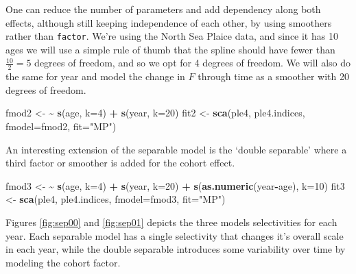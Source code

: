 \documentclass[
]{book}
\newenvironment{Shaded}{\begin{snugshade}}{\end{snugshade}}
\newcommand{\AttributeTok}[1]{\textcolor[rgb]{0.13,0.29,0.53}{#1}}
\newcommand{\DecValTok}[1]{\textcolor[rgb]{0.00,0.00,0.81}{#1}}
\newcommand{\ErrorTok}[1]{\textcolor[rgb]{0.64,0.00,0.00}{\textbf{#1}}}
\newcommand{\FunctionTok}[1]{\textcolor[rgb]{0.13,0.29,0.53}{\textbf{#1}}}
\newcommand{\NormalTok}[1]{#1}
\newcommand{\OtherTok}[1]{\textcolor[rgb]{0.56,0.35,0.01}{#1}}
\newcommand{\SpecialCharTok}[1]{\textcolor[rgb]{0.81,0.36,0.00}{\textbf{#1}}}
\newcommand{\StringTok}[1]{\textcolor[rgb]{0.31,0.60,0.02}{#1}}
\begin{document}
One can reduce the number of parameters and add dependency along both effects, although still keeping independence of each other, by using smoothers rather than \texttt{factor}. We're using the North Sea Plaice data, and since it has 10 ages we will use a simple rule of thumb that the spline should have fewer than \(\frac{10}{2} = 5\) degrees of freedom, and so we opt for 4 degrees of freedom. We will also do the same for year and model the change in \(F\) through time as a smoother with 20 degrees of freedom.

\begin{Shaded}
\begin{Highlighting}[]
\NormalTok{fmod2 }\OtherTok{\textless{}{-}} \ErrorTok{\textasciitilde{}} \FunctionTok{s}\NormalTok{(age, }\AttributeTok{k=}\DecValTok{4}\NormalTok{) }\SpecialCharTok{+} \FunctionTok{s}\NormalTok{(year, }\AttributeTok{k=}\DecValTok{20}\NormalTok{)}
\NormalTok{fit2 }\OtherTok{\textless{}{-}} \FunctionTok{sca}\NormalTok{(ple4, ple4.indices, }\AttributeTok{fmodel=}\NormalTok{fmod2, }\AttributeTok{fit=}\StringTok{"MP"}\NormalTok{)}
\end{Highlighting}
\end{Shaded}

An interesting extension of the separable model is the `double separable' where a third factor or smoother is added for the cohort effect.

\begin{Shaded}
\begin{Highlighting}[]
\NormalTok{fmod3 }\OtherTok{\textless{}{-}} \ErrorTok{\textasciitilde{}} \FunctionTok{s}\NormalTok{(age, }\AttributeTok{k=}\DecValTok{4}\NormalTok{) }\SpecialCharTok{+} \FunctionTok{s}\NormalTok{(year, }\AttributeTok{k=}\DecValTok{20}\NormalTok{) }\SpecialCharTok{+} \FunctionTok{s}\NormalTok{(}\FunctionTok{as.numeric}\NormalTok{(year}\SpecialCharTok{{-}}\NormalTok{age), }\AttributeTok{k=}\DecValTok{10}\NormalTok{)}
\NormalTok{fit3 }\OtherTok{\textless{}{-}} \FunctionTok{sca}\NormalTok{(ple4, ple4.indices, }\AttributeTok{fmodel=}\NormalTok{fmod3, }\AttributeTok{fit=}\StringTok{"MP"}\NormalTok{)}
\end{Highlighting}
\end{Shaded}

Figures \ref{fig:sep00} and \ref{fig:sep01} depicts the three models selectivities for each year. Each separable model has a single selectivity that changes it's overall scale in each year, while the double separable introduces some variability over time by modeling the cohort factor.
\end{document}

